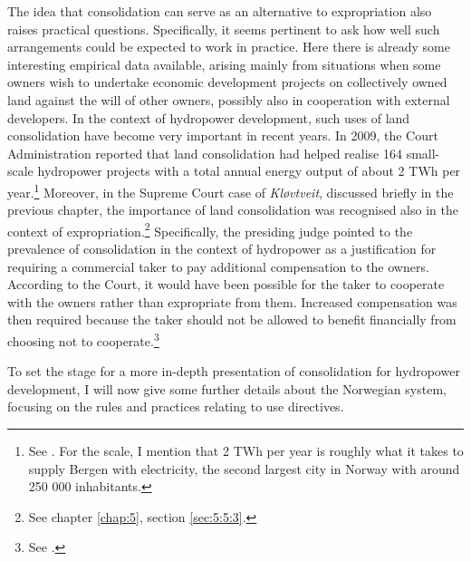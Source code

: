 
The idea that consolidation can serve as an alternative to expropriation also raises practical questions. Specifically, it seems pertinent to ask how well such arrangements could be expected to work in practice. Here there is already some interesting empirical data available, arising mainly from situations when some owners wish to undertake economic development projects on collectively owned land against the will of other owners, possibly also in cooperation with external developers. In the context of hydropower development, such uses of land consolidation have become very important in recent years. In 2009, the Court Administration reported that land consolidation had helped realise 164 small-scale hydropower projects with a total annual energy output of about 2 TWh per year.\footnote{See \cite{gevinst09}. For the scale, I mention that 2 TWh per year is roughly what it takes to supply Bergen with electricity, the second largest city in Norway with around 250 000 inhabitants.} Moreover, in the Supreme Court case of {\it Kløvtveit}, discussed briefly in the previous chapter, the importance of land consolidation was recognised also in the context of expropriation.\footnote{See chapter \ref{chap:5}, section \ref{sec:5:5:3}.} Specifically, the presiding judge pointed to the prevalence of consolidation in the context of hydropower as a justification for requiring a commercial taker to pay additional compensation to the owners. According to the Court, it would have been possible for the taker to cooperate with the owners rather than expropriate from them. Increased compensation was then required because the taker should not be allowed to benefit financially from choosing not to cooperate.\footnote{See \cite{klovtveit11}.}

To set the stage for a more in-depth presentation of consolidation for hydropower development, I will now give some further details about the Norwegian system, focusing on the rules and practices relating to use directives. %

